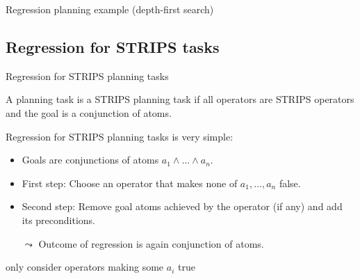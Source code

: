 \documentclass{gkibeamer}
\begin{document}
\begin{frame}{Regression planning example (depth-first search)}
\begin{center}
  \end{center}
\end{frame}

\subsection[STRIPS]{Regression for STRIPS tasks}

\begin{frame}{Regression for STRIPS planning tasks}
  \begin{definition}
    A planning task is a \alert{STRIPS planning task} if all operators
    are STRIPS operators and the goal is a conjunction of atoms.
  \end{definition}

  \medskip

  Regression \alert{for STRIPS planning tasks} is very simple:
  \begin{itemize}
  \item Goals are conjunctions of atoms $a_1 \land \dots \land a_n$.
  \item \alert{First step}: Choose an operator that makes
    none of $a_1, \dots, a_n$ false.
  \item \alert{Second step}: Remove goal atoms achieved by the
    operator (if any) and add its preconditions.
  \item[$\leadsto$] Outcome of regression is again conjunction of
    atoms.
  \end{itemize}
   only consider operators making some $a_i$
  true
\end{frame}
\end{document}
